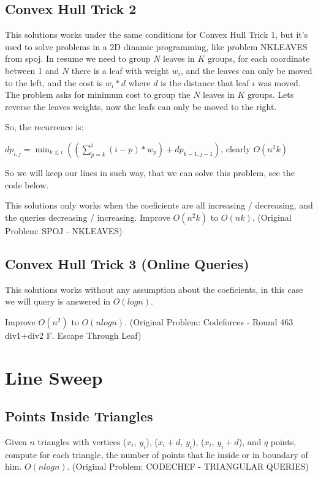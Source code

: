 \documentclass{report}
\begin{document}
        \subsection{Convex Hull Trick 2}
        This solutions works under the same conditions for Convex Hull Trick 1, but it's used to solve problems in a 2D dinamic programming, like problem NKLEAVES from spoj. In resume we need to group $N$ leaves in $K$ groups, for each coordinate between 1 and $N$ there is a leaf with weight $w_i$, and the leaves can only be moved to the left, and the cost is $w_i * d$ where $d$ is the distance that leaf $i$ was moved. The problem asks for minimum cost to group the $N$ leaves in $K$ groups. Lets reverse the leaves weights, now the leafs can only be moved to the right.
        
        So, the recurrence is:
        
        \bigskip
        
        $dp_{i, j} = \min_{k \leq i} ( (\sum_{p=k}^{i} (i - p) * w_p) + dp_{k - 1, j - 1})$, clearly $O(n^2k)$
        
        \bigskip
        
        So we will keep our lines in such way, that we can solve this problem, see the code below. 
        
        This solutions only works when the coeficients are all increasing / decreasing, and the queries decreasing / increasing. Improve $O(n^2k)$ to $O(nk)$. (Original Problem: SPOJ - NKLEAVES)
        
        
        \newpage
        \subsection{Convex Hull Trick 3 (Online Queries)}
        This solutions works without any assumption about the coeficients, in this case we will query is answered in $O(logn)$.
        
        Improve $O(n^2)$ to $O(nlogn)$. (Original Problem: Codeforces - Round 463 div1+div2 F. Escape Through Leaf)
        
        
        \newpage
    \section{Line Sweep}
        \subsection{Points Inside Triangles}
        Given $n$ triangles with vertices {($x_i$, $y_i$), ($x_i + d$, $y_i$), ($x_i$, $y_i + d$)}, and $q$ points, compute for each triangle, the number of points that lie inside or in boundary of him. $O(nlogn)$. (Original Problem: CODECHEF - TRIANGULAR QUERIES)
        
        \newpage
\end{document}
